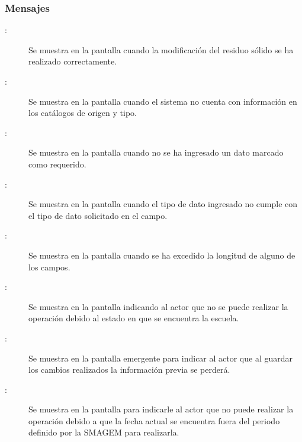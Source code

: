 \subsubsection{Mensajes}

    \begin{description}
      
	    \item [:] Se muestra en la pantalla  cuando la modificación del residuo sólido se ha realizado correctamente.	    
	    
	    \item [:] Se muestra en la pantalla  cuando el sistema no cuenta con información en los catálogos de origen y tipo.
	    
	    \item [:] Se muestra en la pantalla  cuando no se ha ingresado un dato marcado como requerido.
	    
	     \item [:] Se muestra en la pantalla  cuando el tipo de dato ingresado no cumple con el tipo de dato solicitado en el campo.
	    
	    \item [:] Se muestra en la pantalla  cuando se ha excedido la longitud de alguno de los campos.
	    	    
	    \item [:] Se muestra en la pantalla  indicando al actor que no se puede realizar la operación debido al estado en que se encuentra la escuela.
	    
	    	    \item [:] Se muestra en la pantalla emergente  para indicar al actor que al guardar los cambios realizados la información previa se perderá.
	
	\item [:] Se muestra en la pantalla  para indicarle al actor que no puede realizar la operación debido a que la fecha actual se encuentra fuera del periodo definido por la SMAGEM para realizarla.
    \end{description}
